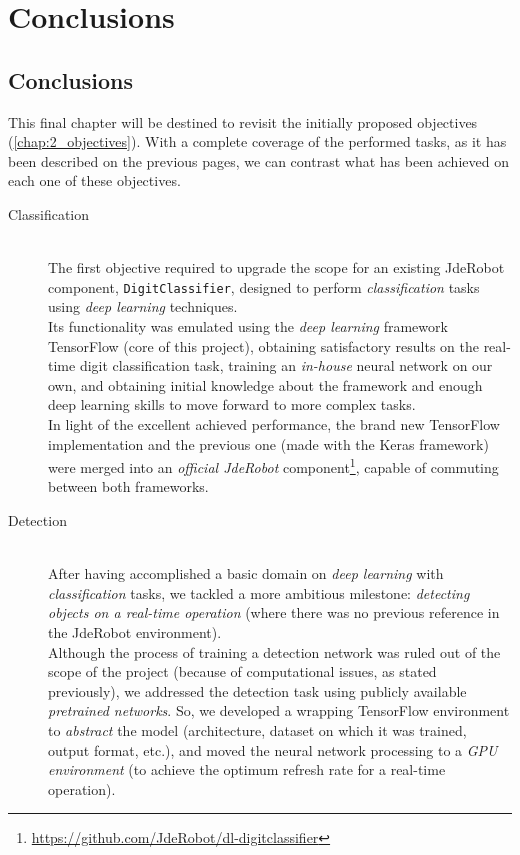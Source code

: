 \chapter{Conclusions}
\section{Conclusions}
	This final chapter will be destined to revisit the initially proposed objectives (\autoref{chap:2_objectives}). With a complete coverage of the performed tasks, as it has been described on the previous pages, we can contrast what has been achieved on each one of these objectives.\\
	
	\begin{description}
		\item[Classification] \hfill
			\vspace{0.2in} \\
			The first objective required to upgrade the scope for an existing JdeRobot component, \texttt{DigitClassifier}, designed to perform \emph{classification} tasks using \emph{deep learning} techniques.\\
			
			Its functionality was emulated using the \emph{deep learning} framework TensorFlow (core of this project), obtaining satisfactory results on the real-time digit classification task, training an \emph{in-house} neural network on our own, and obtaining initial knowledge about the framework and enough deep learning skills to move forward to more complex tasks.\\
			
			In light of the excellent achieved performance, the brand new TensorFlow implementation and the previous one (made with the Keras framework) were merged into an \emph{official JdeRobot} component\footnote{\url{https://github.com/JdeRobot/dl-digitclassifier}}, capable of commuting between both frameworks.
		
		\item[Detection] \hfill
			\vspace{0.2in} \\		
			After having accomplished a basic domain on \emph{deep learning} with \emph{classification} tasks, we tackled a more ambitious milestone: \emph{detecting objects on a real-time operation} (where there was no previous reference in the JdeRobot environment).\\
			
			Although the process of training a detection network was ruled out of the scope of the project (because of computational issues, as stated previously), we addressed the detection task using publicly available \emph{pretrained networks}. So, we developed a wrapping TensorFlow environment to \emph{abstract} the model (architecture, dataset on which it was trained, output format, etc.), and moved the neural network processing to a \emph{GPU environment} (to achieve the optimum refresh rate for a real-time operation).\\
			

\end{description}
